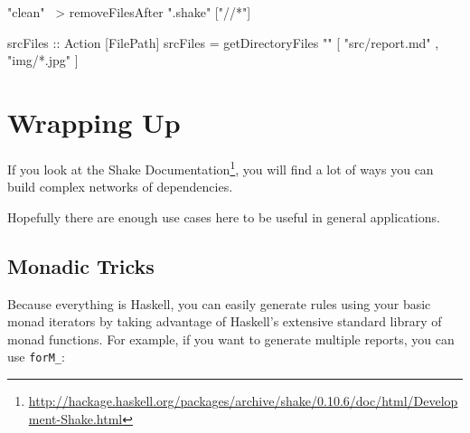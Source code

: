 \documentclass[]{article}
\newenvironment{Shaded}{}{}
\newcommand{\DataTypeTok}[1]{\textcolor[rgb]{0.56,0.13,0.00}{#1}}
\newcommand{\FunctionTok}[1]{\textcolor[rgb]{0.02,0.16,0.49}{#1}}
\newcommand{\NormalTok}[1]{#1}
\newcommand{\OtherTok}[1]{\textcolor[rgb]{0.00,0.44,0.13}{#1}}
\newcommand{\StringTok}[1]{\textcolor[rgb]{0.25,0.44,0.63}{#1}}
\renewcommand{\href}[2]{#2\footnote{\url{#1}}}
\begin{document}
\begin{Shaded}
\begin{Highlighting}[]
    \StringTok{"clean"} \FunctionTok{~>}\NormalTok{ removeFilesAfter }\StringTok{".shake"}\NormalTok{ [}\StringTok{"//*"}\NormalTok{]}

\OtherTok{srcFiles ::} \DataTypeTok{Action}\NormalTok{ [FilePath]}
\NormalTok{srcFiles }\FunctionTok{=}\NormalTok{ getDirectoryFiles }\StringTok{""}
\NormalTok{    [ }\StringTok{"src/report.md"}
\NormalTok{    , }\StringTok{"img/*.jpg"}\NormalTok{ ]}
\end{Highlighting}
\end{Shaded}

\hypertarget{wrapping-up}{%
\section{Wrapping Up}\label{wrapping-up}}

If you look at the
\href{http://hackage.haskell.org/packages/archive/shake/0.10.6/doc/html/Development-Shake.html}{Shake
Documentation}, you will find a lot of ways you can build complex networks of
dependencies.

Hopefully there are enough use cases here to be useful in general applications.

\hypertarget{monadic-tricks}{%
\subsection{Monadic Tricks}\label{monadic-tricks}}

Because everything is Haskell, you can easily generate rules using your basic
monad iterators by taking advantage of Haskell's extensive standard library of
monad functions. For example, if you want to generate multiple reports, you can
use \texttt{forM\_}:
\end{document}
